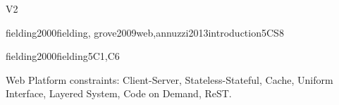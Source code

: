 \begin{syllabus}
\begin{competences}{V2}
    \item {}
    \item {}
    \item {}
\end{competences}

\begin{unit}{\PBDIntroduction}{}{fielding2000fielding, grove2009web,annuzzi2013introduction}{5}{CS8}
\begin{topics}%
    \item \PBDIntroductionTopicOverview
    \item \PBDIntroductionTopicProgramming
    \item \PBDIntroductionTopicOverviewOf
    \item \PBDIntroductionTopicProgrammingUnder
\end{topics}
\begin{learningoutcomes}
    \item \PBDIntroductionLODescribeHowDevelopment [\Familiarity]
    \item \PBDIntroductionLOListCharacteristics [\Familiarity]
    \item \PBDIntroductionLOWriteAnd [\Familiarity]
    \item \PBDIntroductionLOListTheDisadvantages [\Familiarity]
\end{learningoutcomes}
\end{unit}

\begin{unit}{\PBDWebPlatforms}{}{fielding2000fielding}{5}{C1,C6}
\begin{topics}%
    \item \PBDWebPlatformsTopicWeb
    \item \item Web Platform constraints: Client-Server, Stateless-Stateful, Cache, Uniform Interface, Layered System, Code on Demand, ReST.
    \item \PBDWebPlatformsTopicWebPlatform
    \item \PBDWebPlatformsTopicSoftware
    \item \PBDWebPlatformsTopicWebStandards
\end{topics}
\begin{learningoutcomes}
    \item \PBDWebPlatformsLODesignAndSimple [\Familiarity]
    \item \PBDWebPlatformsLODescribeTheTheOn [\Familiarity]
    \item \PBDWebPlatformsLOCompareAndProgramming [\Familiarity]
    \item \PBDWebPlatformsLODescribeTheSoftware [\Familiarity]
    \item \PBDWebPlatformsLODiscussHowImpact [\Familiarity]
    \item \PBDWebPlatformsLOReview [\Familiarity]
\end{learningoutcomes}
\end{unit}


\end{syllabus}
